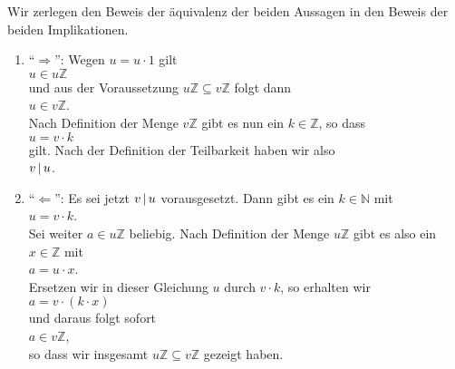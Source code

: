 \proof
Wir zerlegen den Beweis der \"{a}quivalenz der beiden Aussagen in den Beweis der beiden Implikationen.
\begin{enumerate}
\item ``$\Rightarrow$'': Wegen $u = u \cdot 1$ gilt  
      \\[0.2cm]
      \hspace*{1.3cm}
      $u \in u\mathbb{Z}$
      \\[0.2cm]
      und aus der Voraussetzung $u\mathbb{Z} \subseteq v\mathbb{Z}$ folgt dann
      \\[0.2cm]
      \hspace*{1.3cm}
      $u \in v\mathbb{Z}$.
      \\[0.2cm]
      Nach Definition der Menge $v\mathbb{Z}$ gibt es nun ein $k \in \mathbb{Z}$, so dass
      \\[0.2cm]
      \hspace*{1.3cm}
      $u = v \cdot k$
      \\[0.2cm]
      gilt.  Nach der Definition der Teilbarkeit haben wir also
      \\[0.2cm]
      \hspace*{1.3cm}
      $v \,|\, u$.
\item ``$\Leftarrow$'':  Es sei jetzt $v \,|\, u$ vorausgesetzt.  Dann gibt es ein $k \in \mathbb{N}$
      mit 
      \\[0.2cm]
      \hspace*{1.3cm}
      $u = v \cdot k$.
      \\[0.2cm]
      Sei weiter $a \in u\mathbb{Z}$ beliebig.  Nach Definition der Menge $u\mathbb{Z}$ gibt es also
      ein $x \in \mathbb{Z}$ mit
      \\[0.2cm]
      \hspace*{1.3cm}
      $a = u \cdot x$.
      \\[0.2cm]
      Ersetzen wir in dieser Gleichung $u$ durch $v \cdot k$, so erhalten wir
      \\[0.2cm]
      \hspace*{1.3cm}
      $a = v \cdot (k \cdot x)$
      \\[0.2cm]
      und daraus folgt sofort
      \\[0.2cm]
      \hspace*{1.3cm}
      $a \in v\mathbb{Z}$,
      \\[0.2cm]
      so dass wir insgesamt $u\mathbb{Z} \subseteq v\mathbb{Z}$ gezeigt haben.
\end{enumerate}

